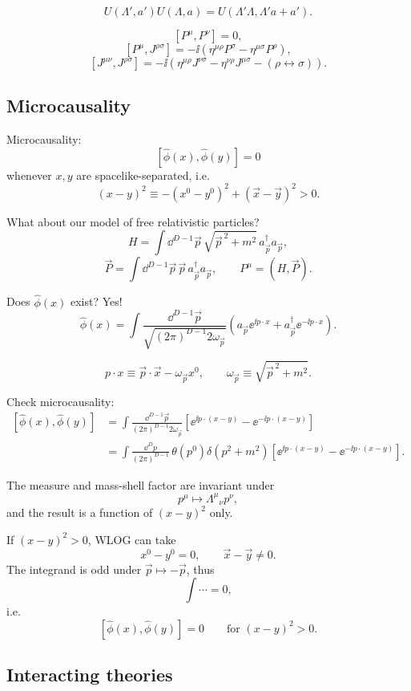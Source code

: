 \[
  U(\Lambda',a')U(\Lambda,a)
  =
  U(\Lambda'\Lambda,\Lambda'a+a').
\]

\[
  [P^\mu,P^\nu]=0,
\]
\[
  [P^\mu,J^{\rho\sigma}]
  =
  -\ii\left(\eta^{\mu\rho}P^\sigma-\eta^{\mu\sigma}P^\rho\right),
\]
\[
  [J^{\mu\nu},J^{\rho\sigma}]
  =
  -\ii\left(
    \eta^{\mu\rho}J^{\nu\sigma}
    -\eta^{\nu\rho}J^{\mu\sigma}
    -(\rho\leftrightarrow\sigma)
  \right).
\]

\subsection{Microcausality}

Microcausality:
\[
  [\hat\phi(x),\hat\phi(y)]=0
\]
whenever $x,y$ are spacelike-separated, i.e.
\[
  (x-y)^2
  \equiv
  -(x^0-y^0)^2+(\vec x-\vec y)^2
  >0.
\]

What about our model of free relativistic particles?
\[
  H=\int \dd^{D-1}\vec p\,\sqrt{\vec p^{\,2}+m^2}\,
  a^\dagger_{\vec p}a_{\vec p},
\]
\[
  \vec P=\int \dd^{D-1}\vec p\,\vec p\,
  a^\dagger_{\vec p}a_{\vec p},
  \qquad
  P^\mu=(H,\vec P).
\]

Does $\hat\phi(x)$ exist? Yes!
\[
  \hat\phi(x)
  =
  \int
  \frac{\dd^{D-1}\vec p}
       {\sqrt{(2\pi)^{D-1}2\omega_{\vec p}}}
  \left(
    a_{\vec p}\ee^{\ii p\cdot x}
    +
    a^\dagger_{\vec p}\ee^{-\ii p\cdot x}
  \right).
\]

\[
  p\cdot x \equiv \vec p\cdot \vec x-\omega_{\vec p}x^0,
  \qquad
  \omega_{\vec p}\equiv\sqrt{\vec p^{\,2}+m^2}.
\]

Check microcausality:
\[
\begin{aligned}
[\hat\phi(x),\hat\phi(y)]
&=
\int
\frac{\dd^{D-1}\vec p}{(2\pi)^{D-1}2\omega_{\vec p}}
\left[
  \ee^{\ii p\cdot(x-y)}
  -
  \ee^{-\ii p\cdot(x-y)}
\right]
\\
&=
\int
\frac{\dd^D p}{(2\pi)^{D-1}}\,
\theta(p^0)\delta(p^2+m^2)
\left[
  \ee^{\ii p\cdot(x-y)}
  -
  \ee^{-\ii p\cdot(x-y)}
\right].
\end{aligned}
\]

The measure and mass-shell factor are invariant under
\[
  p^\mu\longmapsto \Lambda^\mu{}_\nu p^\nu,
\]
and the result is a function of $(x-y)^2$ only.

If $(x-y)^2>0$, WLOG can take
\[
  x^0-y^0=0,
  \qquad
  \vec x-\vec y\neq 0.
\]
The integrand is odd under $\vec p\mapsto-\vec p$, thus
\[
  \int \cdots =0,
\]
i.e.
\[
  [\hat\phi(x),\hat\phi(y)]=0
  \qquad
  \text{for }(x-y)^2>0.
\]

\subsection{Interacting theories}

